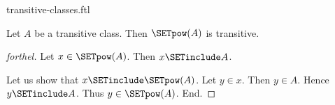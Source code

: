 \documentclass{naproche-library}
\begin{document}
\begin{smodule}[title=Transitive Classes]{transitive-classes.ftl}
\begin{proposition}[forthel,id=SET_THEORY_01_6995689103949824]
  Let $A$ be a transitive class.
  Then $\SETpow(A)$ is transitive.
\end{proposition}
\begin{proof}[forthel]
  Let $x \in \SETpow(A)$.
  Then $x \SETinclude A$.

  Let us show that $x \SETinclude \SETpow(A)$.
    Let $y \in x$.
    Then $y \in A$.
    Hence $y \SETinclude A$.
    Thus $y \in \SETpow(A)$.
  End.
\end{proof}
\end{smodule}
\end{document}
